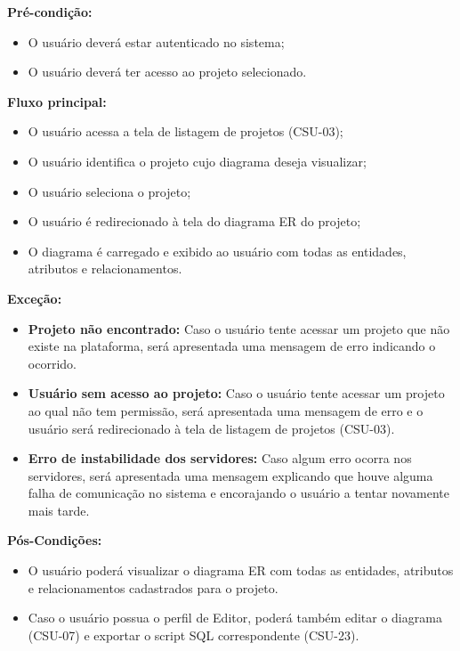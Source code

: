 \textbf{Pré-condição:}
\begin{itemize}
    \item O usuário deverá estar autenticado no sistema;
    \item O usuário deverá ter acesso ao projeto selecionado.
\end{itemize}

\textbf{Fluxo principal:}
\begin{itemize}
    \item O usuário acessa a tela de listagem de projetos (CSU-03);
    \item O usuário identifica o projeto cujo diagrama deseja visualizar;
    \item O usuário seleciona o projeto;
    \item O usuário é redirecionado à tela do diagrama ER do projeto;
    \item O diagrama é carregado e exibido ao usuário com todas as entidades, atributos e relacionamentos.
\end{itemize}

\textbf{Exceção:}
\begin{itemize}
    \item \textbf{Projeto não encontrado:} Caso o usuário tente acessar um projeto que não existe na plataforma, será apresentada uma mensagem de erro indicando o ocorrido.
    \item \textbf{Usuário sem acesso ao projeto:} Caso o usuário tente acessar um projeto ao qual não tem permissão, será apresentada uma mensagem de erro e o usuário será redirecionado à tela de listagem de projetos (CSU-03).
    \item \textbf{Erro de instabilidade dos servidores:} Caso algum erro ocorra nos servidores, será apresentada uma mensagem explicando que houve alguma falha de comunicação no sistema e encorajando o usuário a tentar novamente mais tarde.
\end{itemize}

\textbf{Pós-Condições:}
\begin{itemize}
    \item O usuário poderá visualizar o diagrama ER com todas as entidades, atributos e relacionamentos cadastrados para o projeto.
    \item Caso o usuário possua o perfil de Editor, poderá também editar o diagrama (CSU-07) e exportar o script SQL correspondente (CSU-23).
\end{itemize}

\vspace{1em}

